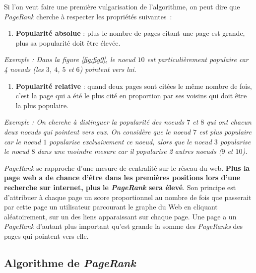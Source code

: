 \documentclass[10pt,a4paper]{article}
\providecommand{\tightlist}{%
  \setlength{\parskip}{0pt}
  }
\theoremstyle{break}
\begin{document}
Si l'on veut faire une première vulgarisation de l'algorithme, on peut dire que \emph{PageRank} cherche à respecter les propriétés suivantes~:

\begin{enumerate}
\def\labelenumi{\arabic{enumi}.}
\tightlist
\item
  \textbf{Popularité absolue} : plus le nombre de pages citant une page est grande, plus sa popularité doit être élevée.
\end{enumerate}

\emph{Exemple : Dans la figure \ref{fig:fig0}, le noeud \(10\) est particulièrement populaire car 4 noeuds (les \(3\), \(4\), \(5\) et \(6\)) pointent vers lui.}

\begin{enumerate}
\def\labelenumi{\arabic{enumi}.}
\setcounter{enumi}{1}
\tightlist
\item
  \textbf{Popularité relative} : quand deux pages sont citées le même nombre de fois, c'est la page qui a été le plus cité en proportion par ses voisins qui doit être la plus populaire.
\end{enumerate}

\emph{Exemple : On cherche à distinguer la popularité des noeuds \(7\) et \(8\) qui ont chacun deux noeuds qui pointent vers eux. On considère que le noeud \(7\) est plus populaire car le noeud \(1\) popularise exclusivement ce noeud, alors que le noeud \(3\) popularise le noeud \(8\) dans une moindre mesure car il popularise 2 autres noeuds (\(9\) et \(10\)).}

\faArrowCircleRight{} \emph{PageRank} se rapproche d'une mesure de centralité sur le réseau du web. \textbf{Plus la page web a de chance d'être dans les premières positions lors d'une recherche sur internet, plus le \emph{PageRank} sera élevé}. Son principe est d'attribuer à chaque page un score proportionnel au nombre de fois que passerait par cette page un utilisateur parcourant le graphe du Web en cliquant aléatoirement, sur un des liens apparaissant sur chaque page. Une page a un \emph{PageRank} d'autant plus important qu'est grande la somme des \emph{PageRanks} des pages qui pointent vers elle.

\hypertarget{algorithme-de-pagerank}{%
\subsection{\texorpdfstring{Algorithme de \emph{PageRank}}{Algorithme de PageRank}}\label{algorithme-de-pagerank}}
\end{document}
